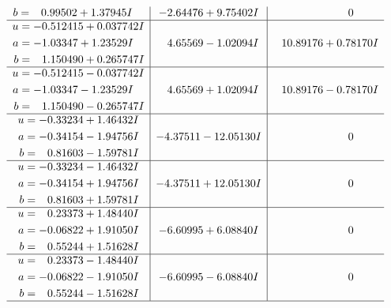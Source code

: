 \documentclass[1p]{elsarticle_modified}
\theoremstyle{definition}
\begin{document}
$$\begin{array}{c|c|c}
\begin{aligned}
b &= \phantom{-}0.99502 + 1.37945 I\end{aligned}
 & -2.64476 + 9.75402 I & \phantom{-0.000000 } 0 \\ \hline\begin{aligned}
u &= -0.512415 + 0.037742 I \\
a &= -1.03347 + 1.23529 I \\
b &= \phantom{-}1.150490 + 0.265747 I\end{aligned}
 & \phantom{-}4.65569 - 1.02094 I & \phantom{-}10.89176 + 0.78170 I \\ \hline\begin{aligned}
u &= -0.512415 - 0.037742 I \\
a &= -1.03347 - 1.23529 I \\
b &= \phantom{-}1.150490 - 0.265747 I\end{aligned}
 & \phantom{-}4.65569 + 1.02094 I & \phantom{-}10.89176 - 0.78170 I \\ \hline\begin{aligned}
u &= -0.33234 + 1.46432 I \\
a &= -0.34154 - 1.94756 I \\
b &= \phantom{-}0.81603 - 1.59781 I\end{aligned}
 & -4.37511 - 12.05130 I & \phantom{-0.000000 } 0 \\ \hline\begin{aligned}
u &= -0.33234 - 1.46432 I \\
a &= -0.34154 + 1.94756 I \\
b &= \phantom{-}0.81603 + 1.59781 I\end{aligned}
 & -4.37511 + 12.05130 I & \phantom{-0.000000 } 0 \\ \hline\begin{aligned}
u &= \phantom{-}0.23373 + 1.48440 I \\
a &= -0.06822 + 1.91050 I \\
b &= \phantom{-}0.55244 + 1.51628 I\end{aligned}
 & -6.60995 + 6.08840 I & \phantom{-0.000000 } 0 \\ \hline\begin{aligned}
u &= \phantom{-}0.23373 - 1.48440 I \\
a &= -0.06822 - 1.91050 I \\
b &= \phantom{-}0.55244 - 1.51628 I\end{aligned}
 & -6.60995 - 6.08840 I & \phantom{-0.000000 } 0\\
 \hline 
 \end{array}$$\newpage$$\begin{array}{c|c|c}  

\end{array}$$
\end{document}
